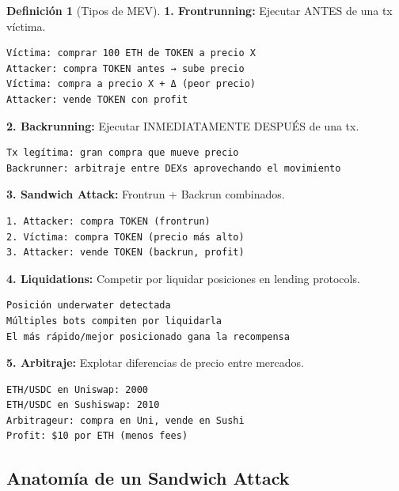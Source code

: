 \documentclass[11pt,a4paper,twoside,openright]{book}
\theoremstyle{definition}
\newtheorem{definition}{Definición}[chapter]
\theoremstyle{plain}
\theoremstyle{remark}
\begin{document}
\begin{definition}[Tipos de MEV]
\textbf{1. Frontrunning:}
Ejecutar ANTES de una tx víctima.
\begin{verbatim}
Víctima: comprar 100 ETH de TOKEN a precio X
Attacker: compra TOKEN antes → sube precio
Víctima: compra a precio X + Δ (peor precio)
Attacker: vende TOKEN con profit
\end{verbatim}

\textbf{2. Backrunning:}
Ejecutar INMEDIATAMENTE DESPUÉS de una tx.
\begin{verbatim}
Tx legítima: gran compra que mueve precio
Backrunner: arbitraje entre DEXs aprovechando el movimiento
\end{verbatim}

\textbf{3. Sandwich Attack:}
Frontrun + Backrun combinados.
\begin{verbatim}
1. Attacker: compra TOKEN (frontrun)
2. Víctima: compra TOKEN (precio más alto)
3. Attacker: vende TOKEN (backrun, profit)
\end{verbatim}

\textbf{4. Liquidations:}
Competir por liquidar posiciones en lending protocols.
\begin{verbatim}
Posición underwater detectada
Múltiples bots compiten por liquidarla
El más rápido/mejor posicionado gana la recompensa
\end{verbatim}

\textbf{5. Arbitraje:}
Explotar diferencias de precio entre mercados.
\begin{verbatim}
ETH/USDC en Uniswap: 2000
ETH/USDC en Sushiswap: 2010
Arbitrageur: compra en Uni, vende en Sushi
Profit: $10 por ETH (menos fees)
\end{verbatim}
\end{definition}

\subsection{Anatomía de un Sandwich Attack}
\end{document}
